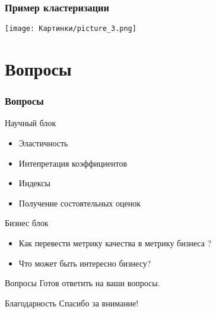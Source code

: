 \documentclass[unicode]{beamer}
\begin{document}
\begin{frame}
	\frametitle{Пример кластеризации}
	\centering
	\texttt{[image: Картинки/picture\_3.png]}
	
	
\end{frame}
	


\section{Вопросы}
\begin{frame}
	\frametitle{Вопросы}
	\begin{block}{Научный блок}
		\begin{itemize}
			\item Эластичность
			
			\item Интепретация коэффициентов
			
			\item Индексы
			
			\item Получение состоятельных оценок
		\end{itemize}

		
	\end{block} \pause

	\begin{exampleblock}{Бизнес блок}
		\begin{itemize}
			\item Как перевести метрику качества в метрику бизнеса ?
			
			\item Что может быть интересно бизнесу?
		\end{itemize}
	\end{exampleblock}
\end{frame}

\begin{frame}{Вопросы}
	\centering
	\huge
	Готов ответить на ваши вопросы.
\end{frame}
\begin{frame}{Благодарность}
	\centering
	\huge
	Спасибо за внимание!
	
\end{frame}
\end{document}
